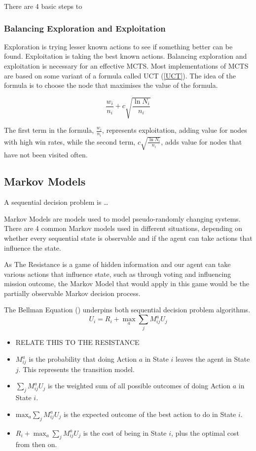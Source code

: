 \documentclass[a4paper]{article}
\begin{document}
There are 4 basic steps to

\subsubsection{Balancing Exploration and Exploitation}
Exploration is trying lesser known actions to see if something better can be found.
Exploitation is taking the best known actions.
Balancing exploration and exploitation is necessary for an effective MCTS.
Most implementations of MCTS are based on some variant of a formula called UCT (\ref{UCT}).
The idea of the formula is to choose the node that maximises the value of the formula. \cite{10.1007/11871842_29}

\begin{equation}\label{UCT}
    \frac{w_i}{n_i} + c \sqrt{\frac{\ln{N_i}}{n_i}}
\end{equation}

The first term in the formula, $\frac{w_i}{n_i}$, represents exploitation, adding value for nodes with high win rates,
while the second term, $c \sqrt{\frac{\ln{N_i}}{n_i}}$, adds value for nodes that have not been visited often.

\subsection{Markov Models}

A sequential decision problem is \dots

Markov Models are models used to model pseudo-randomly changing systems. There are 4 common Markov models used in different situations, depending on whether every sequential state is observable and if the agent can take actions that influence the state.

As The Resistance is a game of hidden information and our agent can take various actions that influence state, such as through voting and influencing mission outcome, the Markov Model that would apply in this game would be the partially observable Markov decision process.

The Bellman Equation () underpins both sequential decision problem algorithms.
\begin{equation}\label{Bellman Equation}
    U_{i} = R_{i} + \max_{a} \sum_{j} M_{ij}^{a} U_{j}
\end{equation}
\begin{itemize}
    \item RELATE THIS TO THE RESISTANCE
    \item $M_{ij}^{a}$ is the probability that doing Action $a$ in State $i$ leaves the agent in State $j$. This represents the transition model.
    \item $\sum_{j} M_{ij}^{a} U_{j}$ is the weighted sum of all possible outcomes of doing Action $a$ in State $i$.
    \item $\textrm{max}_{a} \sum_{j} M_{ij}^{a} U_{j}$ is the expected outcome of the best action to do in State $i$.
    \item $R_{i} + \max_{a} \sum_{j} M_{ij}^{a} U_{j}$ is the cost of being in State $i$, plus the optimal cost from then on.
\end{itemize}
\end{document}
